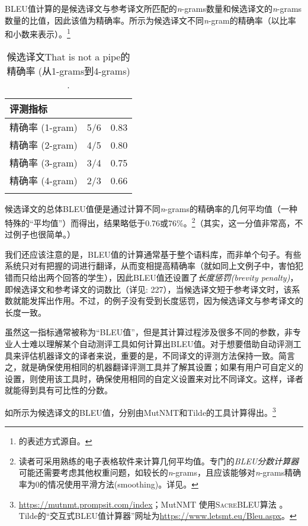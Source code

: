 \documentclass[output=paper]{langscibook}
\begin{document}
BLEU值计算的是候选译文与参考译文所匹配的\textit{n}-grams数量和候选译文的\textit{n}-grams数量的比值，因此该值为精确率。所示为候选译文不同\textit{n}-gram的精确率（以比率和小数来表示）。\footnote{的表述方式源自\citep[227]{Koehn2010}。}


\begin{table}
\begin{tabular}{lrr}
\lsptoprule
{评测指标} &  & \\
\midrule
精确率 (1-gram) & 5/6 & 0.83\\
精确率 (2-gram) & 4/5 & 0.80\\
精确率 (3-gram) & 3/4 & 0.75\\
精确率 (4-gram) & 2/3 & 0.66\\
\lspbottomrule
\end{tabular}
\caption{候选译文That is not a pipe的精确率 (从1-grams到4-grams) \label{tab:rossi:12}.}
\end{table}

候选译文的总体BLEU值便是通过计算不同\textit{n}-grams的精确率的几何平均值（一种特殊的“平均值”）而得出，结果略低于0.76或76\%。\footnote{读者可采用熟练的电子表格软件来计算几何平均值。专门的\textit{BLEU分数计算器}可能还需要考虑其他权重问题，如较长的\textit{n}-grams，且应该能够对\textit{n}-grams精确率为0的情况使用平滑方法(smoothing)。详见\citet{Post2018}。}（其实，这一分值非常高，不过例子也很简单。）

我们还应该注意的是，BLEU值的计算通常基于整个语料库，而非单个句子。有些系统只对有把握的词进行翻译，从而变相提高精确率（就如同上文例子中，害怕犯错而只给出两个回答的学生），因此BLEU值还设置了\textit{长度惩罚(brevity penalty)}，即候选译文和参考译文的词数比（详见\citealt{Koehn2020}: 227），当候选译文短于参考译文时，该系数就能发挥出作用。不过，的例子没有受到长度惩罚，因为候选译文与参考译文的长度一致。

虽然这一指标通常被称为“BLEU值”，但是其计算过程涉及很多不同的参数\citep{Post2018}，非专业人士难以理解某个自动测评工具如何计算出BLEU值。对于想要借助自动评测工具来评估机器译文的译者来说，重要的是，不同译文的评测方法保持一致。简言之，就是确保使用相同的机器翻译评测工具并了解其设置；如果有用户可自定义的设置，则使用该工具时，确保使用相同的自定义设置来对比不同译文。这样，译者就能得到具有可比性的分数。

如所示为候选译文的BLEU值，分别由MutNMT和Tilde的工具计算得出。\footnote{\url{https://mutnmt.prompsit.com/index}；MutNMT 使用\textsc{SacreBLEU}算法 \citep{Post2018}。 Tilde的“交互式BLEU值计算器”网址为\url{https://www.letsmt.eu/Bleu.aspx}。}
\end{document}
